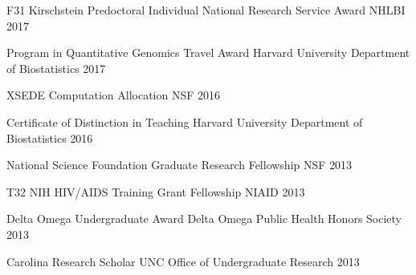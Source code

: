 


\begin{cvhonors}

  \cvhonor
    {F31 Kirschstein Predoctoral Individual National Research Service Award} %
    {NHLBI}
    { } %
    {2017} %
    
  \cvhonor
    {Program in Quantitative Genomics Travel Award} %
    {Harvard University Department of Biostatistics} %
    { } %
    {2017} %
    
  \cvhonor
    {XSEDE Computation Allocation} %
    {NSF}
    { } %
    {2016} %
    
  \cvhonor
    {Certificate of Distinction in Teaching} %
    {Harvard University Department of Biostatistics} %
    { } %
    {2016} %

  \cvhonor
    {National Science Foundation Graduate Research Fellowship} %
    {NSF}
    { } %
    {2013} %
    
  \cvhonor %
    {T32 NIH HIV/AIDS Training Grant Fellowship} %
    {NIAID}
    { } %
    {2013} %
 
  \cvhonor
    {Delta Omega Undergraduate Award} %
    {Delta Omega Public Health Honors Society} %
    { } %
    {2013} %
    
  \cvhonor
    {Carolina Research Scholar} %
    {UNC Office of Undergraduate Research} %
    { } %
    {2013} %
    

\end{cvhonors}
